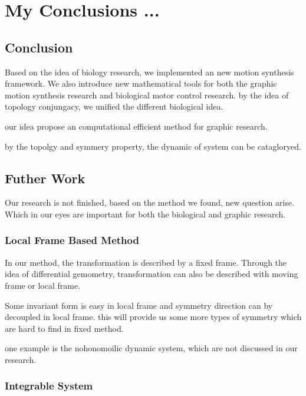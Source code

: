 \def\baselinestretch{1}
\chapter{My Conclusions ...}
\ifpdf
    \graphicspath{{Conclusions/ConclusionsFigs/PNG/}{Conclusions/ConclusionsFigs/PDF/}{Conclusions/ConclusionsFigs/}}
\else
    \graphicspath{{Conclusions/ConclusionsFigs/EPS/}{Conclusions/ConclusionsFigs/}}
\fi

\def\baselinestretch{1.66}

\section{Conclusion}

Based on the idea of biology research, we implemented an new motion synthesis framework.
We also introduce new mathematical tools for both the graphic motion synthesis research and biological motor control research.
by the idea of topology conjungacy, we unified the different biological idea.

our idea propose an computational efficient method for graphic research.

by the topolgy and symmery property,
the dynamic of system can be catagloryed.




\section{Futher Work}
Our research is not finished, based on the method we found, new question arise.
Which in our eyes are important for both the biological and graphic research.
\subsection{Local Frame Based Method}
In our method, the transformation is described by a fixed frame.
Through the idea of differential gemometry, transformation can also be described with moving frame or local frame.

Some invariant form is easy in local frame and symmetry direction can by decoupled in local frame.
this will provide us  some more types of symmetry which are hard to find in fixed method.

one example is the nohonomoilic dynamic system, which are not discussed in our research.


\subsection{Integrable System}

